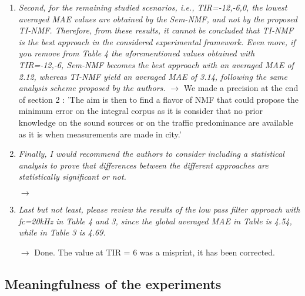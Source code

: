 \documentclass[10pt]{article}
\begin{document}
\begin{enumerate}
\item \emph{Second, for the remaining studied scenarios, i.e., TIR={-12,-6,0}, the lowest averaged MAE values are obtained by the Sem-NMF, and not by the proposed TI-NMF.
Therefore, from these results, it cannot be concluded that TI-NMF is the best approach in the considered experimental framework. Even more, if you remove from Table 4 the aforementioned values obtained with TIR={-12,-6}, Sem-NMF becomes the best approach with an averaged MAE of 2.12, whereas TI-NMF yield an averaged MAE of 3.14, following the same analysis scheme proposed by the authors.}
$\rightarrow$ We made a precision at the end of section 2 : 'The aim is then to find a flavor of NMF that could propose the minimum error on the integral corpus as it is consider that no prior knowledge on the sound sources or on the traffic predominance are available as it is when measurements are made in city.'

\item \emph{Finally, I would recommend the authors to consider including a statistical analysis to prove that differences between the different approaches are statistically significant or not.}

$\rightarrow$ 

\item \emph{Last but not least, please review the results of the low pass filter approach with fc=20kHz in Table 4 and 3, since the global averaged MAE in Table is 4.54, while in Table 3 is 4.69.}

$\rightarrow$ Done. The value at TIR = 6 was a misprint, it has been corrected.


\end{enumerate}

\subsection{Meaningfulness of the experiments}
\end{document}
